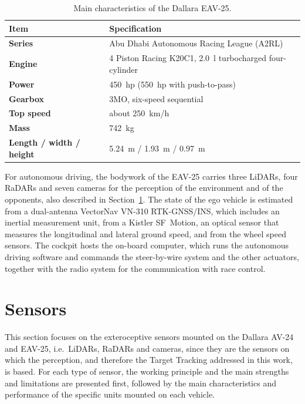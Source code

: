 \begin{table}[H]
    \centering
    \small
    \begin{tabular}{|p{}p{}|}
        \hline
        \rowcolor{bluepoli!40} \textbf{Item} & \textbf{Specification} \\
        \hline\hline
        \textbf{Series} & Abu Dhabi Autonomous Racing League (A2RL) \\
        \textbf{Engine} & 4 Piston Racing K20C1, \SI{2.0}{l} turbocharged four-cylinder \\
        \textbf{Power} & \SI{450}{hp} (\SI{550}{hp} with push-to-pass) \\
        \textbf{Gearbox} & 3MO, six-speed sequential \\
        \textbf{Top speed} & about \SI{250}{km/h} \\
        \textbf{Mass} & \SI{742}{kg} \\
        \textbf{Length / width / height} & \SI{5.24}{m} / \SI{1.93}{m} / \SI{0.97}{m} \\
        \hline
    \end{tabular}
    \caption{Main characteristics of the Dallara EAV-25.}
    \label{tab:eav24}
\end{table}

For autonomous driving, the bodywork of the EAV-25 carries three LiDARs, four RaDARs and
seven cameras for the perception of the environment and of the opponents, also described
in Section~\ref{sec:sensors}. The state of the ego vehicle is estimated from a
dual-antenna VectorNav VN-310 RTK-GNSS/INS, which includes an inertial measurement unit,
from a Kistler SF~Motion, an optical sensor that measures the longitudinal and lateral
ground speed, and from the wheel speed sensors. The cockpit hosts the on-board computer,
which runs the autonomous driving software and commands the steer-by-wire system and the
other actuators, together with the radio system for the communication with race control.

\FloatBarrier

\section{Sensors}
\label{sec:sensors}

This section focuses on the exteroceptive sensors mounted on the Dallara AV-24 and EAV-25,
i.e.\ LiDARs, RaDARs and cameras, since they are the sensors on which the perception, and
therefore the Target Tracking addressed in this work, is based. For each type of sensor, the
working principle and the main strengths and limitations are presented first, followed by the
main characteristics and performance of the specific units mounted on each vehicle.

